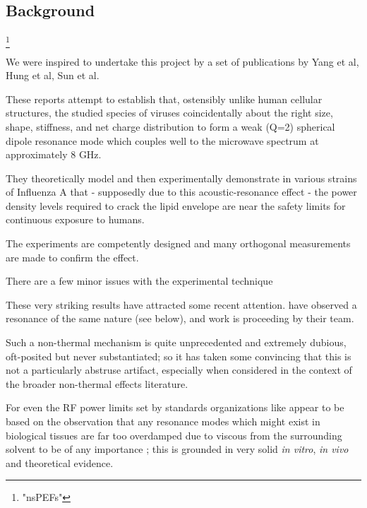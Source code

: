 \documentclass[paper.tex]{subfiles}
\begin{document}
\begin{multicols}{1}

\section{Background}













\footnote{"nsPEFs"}



We were inspired to undertake this project by a set of publications by Yang et al, Hung et al, Sun et al.

These reports attempt to establish that, ostensibly unlike human cellular structures, the studied species of viruses coincidentally about the right size, shape, stiffness, and net charge distribution to form a weak (Q=2) spherical dipole resonance mode which couples well to the microwave spectrum at approximately 8 GHz.

They theoretically model and then experimentally demonstrate in various strains of Influenza A that - supposedly due to this acoustic-resonance effect - the power density levels required to crack the lipid envelope are near the safety limits for continuous exposure to humans.

The experiments are competently designed and many orthogonal measurements are made to confirm the effect.

There are a few minor issues with the experimental technique 

These very striking results have attracted some recent attention. \cite{Burkhartsmeier} have observed a resonance of the same nature (see below), and work is proceeding by their team.

Such a non-thermal mechanism is quite unprecedented and extremely dubious, oft-posited but never substantiated; so it has taken some convincing that this is not a particularly abstruse artifact, especially when considered in the context of the broader non-thermal effects literature.

For even the RF power limits set by standards organizations like \cite{ICNIRP2020} \cite{IEEE2006} appear to be based on the observation that any resonance modes which might exist in biological tissues are far too overdamped due to viscous from the surrounding solvent to be of any importance \cite{Vibrational2002}; this is grounded in very solid {\it in vitro}, {\it in vivo} and theoretical evidence. 


\end{multicols}
\end{document}
